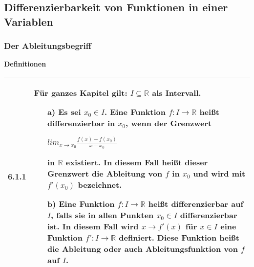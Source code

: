 \subsection{Differenzierbarkeit von Funktionen in einer Variablen}
\subsubsection{Der Ableitungsbegriff}

    \noindent
    \textbf{Definitionen}
    \begin{table}[H]  
    \begin{tabularx}{\textwidth}{X m{16cm}}
        \toprule

        6.1.1 & Für ganzes Kapitel gilt: $I \subseteq \mathbb{R}$ als Intervall.
                \begin{itemize}[topsep=-0.5cm]
                    \item[a)] Es sei $x_0 \in I$. Eine Funktion $f: I \rightarrow \mathbb{R}$ heißt differenzierbar in $x_0$, wenn der Grenzwert 
                                \centerline{$lim_{x \rightarrow x_0} \frac{f(x)-f(x_0)}{x-x_0}$}
                                in $\mathbb{R}$ existiert. In diesem Fall heißt dieser Grenzwert die \textbf{Ableitung} von $f$ in $x_0$ und wird 
                                mit \textbf{$f'(x_0)$} bezeichnet.
                    \item[b)] Eine Funktion $f: I \rightarrow \mathbb{R}$ heißt \textbf{differenzierbar} auf $I$, falls sie in allen Punkten
                                $x_0 \in I$ differenzierbar ist. In diesem Fall wird $x \rightarrow f'(x)$  für $x \in I$ eine Funktion 
                                $f': I \rightarrow \mathbb{R}$ definiert. Diese Funktion heißt die \textbf{Ableitung} oder auch 
                                \textbf{Ableitungsfunktion} von $f$ auf $I$.
                \end{itemize} \vspace{-0cm} \\

        \bottomrule

    \end{tabularx}
    \end{table}

